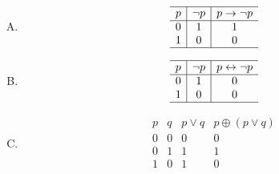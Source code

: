 {{        %
        \begin{practices}
            \begin{enumerate}[A.]
                \item 
                {
                    \begin{table}[H]
                        \[
                            \begin{array}{c|c|c}
                                \hline
                                p & \neg p & p \rightarrow \neg p \\
                                \hline
                                0 & 1 & 1 \\
                                1 & 0 & 0 \\
                                \hline
                            \end{array}
                        \]
                    \end{table}
                }
                \item 
                {
                    \begin{table}[H]
                        \[
                            \begin{array}{c|c|c}
                                \hline
                                p & \neg p & p \leftrightarrow \neg p \\
                                \hline
                                0 & 1 & 0 \\
                                1 & 0 & 0 \\
                                \hline
                            \end{array}
                        \]
                    \end{table}
                }
                \item 
                {
                    \begin{table}[H]
                        \[
                            \begin{array}{c|c|c|c}
                                \hline
                                p & q & p \vee q & p \oplus (p \vee q) \\
                                \hline
                                0 & 0 & 0 & 0 \\
                                0 & 1 & 1 & 1 \\
                                1 & 0 & 1 & 0 \\

\end{array}\]
\end{table}}
\end{enumerate}
\end{practices}}}
